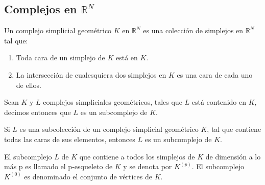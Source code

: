 \subsection{Complejos en $\mathbb{R}^N$}
\begin{Defi}
Un complejo simplicial geométrico $\textit{K}$ en $\mathbb{R}^N$  es una colección de simplejos en $\mathbb{R}^N$ tal que:
\begin{enumerate}
\item Toda cara de un simplejo de $\textit{K}$ está en $\textit{K}$.
\item La intersección de cualesquiera dos simplejos en $\textit{K}$ es una cara de cada uno de ellos.
\end{enumerate} 
\end{Defi}
\begin{Defi}
Sean $\textit{K}$ y $\textit{L}$ complejos simpliciales geométricos, tales que $\textit{L}$ está contenido en $\textit{K}$, decimos entonces que $\textit{L}$ es un subcomplejo de $\textit{K}$. 
\end{Defi}

\begin{Prop}
Si $\textit{L}$ es una subcolección de un complejo simplicial geométrico $\textit{K}$, tal que contiene todas las caras de sus elementos, entonces $\textit{L}$ es un subcomplejo de $\textit{K}$.
\end{Prop}

\begin{Defi}
El subcomplejo $\textit{L}$ de $\textit{K}$ que contiene a todos los simplejos de $\textit{K}$ de dimensión a lo más p es llamado el p-esqueleto de $\textit{K}$ y se denota por $\textit{K}^{(p)}$. 
El subcomplejo $\textit{K}^{(0)}$ es denominado el conjunto de vértices de $\textit{K}$.
\end{Defi}

